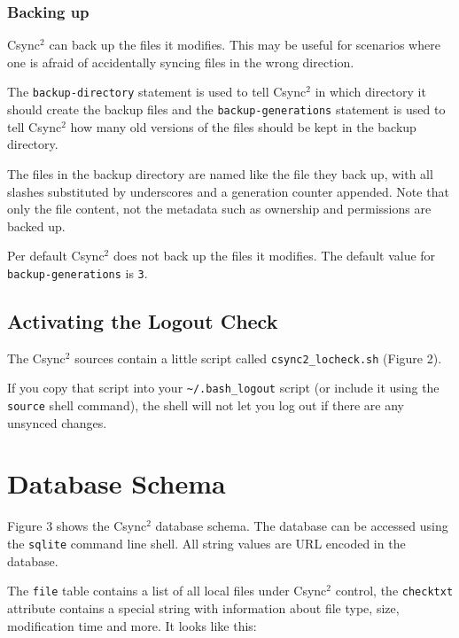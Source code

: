 \documentclass[a4paper,twocolumn]{article}
\def\csync2{{\sc Csync$^{2}$}}
\begin{document}

\subsubsection{Backing up}

\csync2 can back up the files it modifies. This may be useful for scenarios
where one is afraid of accidentally syncing files in the wrong direction.

The {\tt backup-directory} statement is used to tell \csync2 in which directory
it should create the backup files and the {\tt backup-generations} statement is
used to tell \csync2 how many old versions of the files should be kept in the
backup directory.

The files in the backup directory are named like the file they back up, with
all slashes substituted by underscores and a generation counter appended. Note
that only the file content, not the metadata such as ownership and permissions
are backed up.

Per default \csync2 does not back up the files it modifies. The default
value for {\tt backup-generations} is {\tt 3}.

\subsection{Activating the Logout Check}

The \csync2 sources contain a little script called {\tt csync2\_locheck.sh} 
(Figure 2).

If you copy that script into your {\tt \textasciitilde/.bash\_logout} script
(or include it using the {\tt source} shell command), the shell will not let
you log out if there are any unsynced changes.

\section{Database Schema}

Figure 3 shows the \csync2 database schema. The database can be accessed using
the {\tt sqlite} command line shell. All string values are URL encoded in the
database.

The {\tt file} table contains a list of all local files under \csync2 control,
the {\tt checktxt} attribute contains a special string with information about
file type, size, modification time and more. It looks like this:
\end{document}
